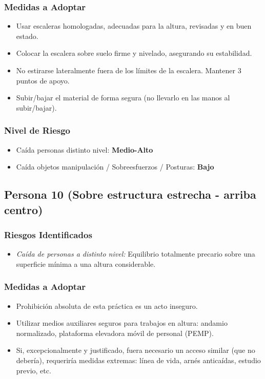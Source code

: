 \documentclass[12pt,a4paper]{article}
\begin{document}
	\subsubsection{Medidas a Adoptar}
	\begin{itemize}
		\item Usar escaleras homologadas, adecuadas para la altura, revisadas y en buen estado.
		\item Colocar la escalera sobre suelo firme y nivelado, asegurando su estabilidad.
		\item No estirarse lateralmente fuera de los límites de la escalera. Mantener 3 puntos de apoyo.
		\item Subir/bajar el material de forma segura (no llevarlo en las manos al subir/bajar).
	\end{itemize}
	
	\subsubsection{Nivel de Riesgo}
	\begin{itemize}
		\item Caída personas distinto nivel: \textbf{Medio-Alto}
		\item Caída objetos manipulación / Sobreesfuerzos / Posturas: \textbf{Bajo}
	\end{itemize}
	
	\bigskip\hrulefill\bigskip
	
	\subsection{Persona 10 (Sobre estructura estrecha - arriba centro)}
	
	\subsubsection{Riesgos Identificados}
	\begin{itemize}
		\item \textit{Caída de personas a distinto nivel:} Equilibrio totalmente precario sobre una superficie mínima a una altura considerable.
	\end{itemize}
	
	\subsubsection{Medidas a Adoptar}
	\begin{itemize}
		\item Prohibición absoluta de esta práctica es un acto inseguro.
		\item Utilizar medios auxiliares seguros para trabajos en altura: andamio normalizado, plataforma elevadora móvil de personal (PEMP).
		\item Si, excepcionalmente y justificado, fuera necesario un acceso similar (que no debería), requeriría medidas extremas: línea de vida, arnés anticaídas, estudio previo, etc.
	\end{itemize}
	
\end{document}
